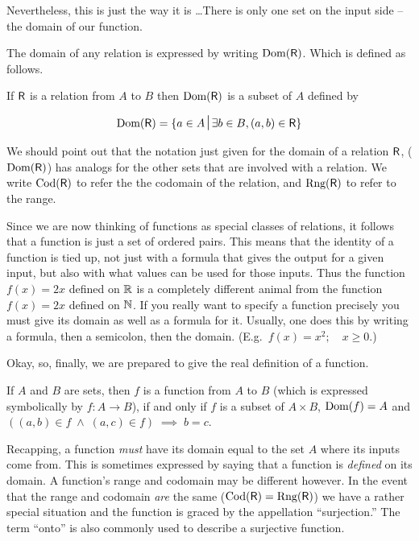 Nevertheless, this is just the way it is \ldots  There is only one
set on the input side -- the domain of our function. 

The domain of
any relation is expressed by writing $\mbox{Dom}(\mbox{\textsf R})$.  Which is 
defined as follows.

\begin{defi}
If $\mbox{\textsf R}$ is a relation from $A$ to $B$ then $\mbox{Dom}(\mbox{\textsf R})$ is
a subset of $A$ defined by

\[ \Dom{\relR} = \{a \in A \suchthat \exists b \in B, (a,b) \in \relR \} 
\]

\end{defi}

We should point out that the notation just given for the domain of a 
relation $\mbox{\textsf R}$, ($\mbox{Dom}(\mbox{\textsf R})$) has analogs for the other 
sets that are involved with a relation.  We write $\mbox{Cod}(\mbox{\textsf R})$
to refer the the codomain of the relation, and $\mbox{Rng}(\mbox{\textsf R})$
to refer to the range. 

Since we are now thinking of functions as special classes of relations, it follows that a function is just 
a set of ordered pairs.  This means that the identity of a function is
tied up, not just with a formula that gives the output for a given input,
but also with what values can be used for those inputs.   Thus the function
$f(x)=2x$ defined on ${\mathbb R}$ is a completely different animal from 
the function $f(x)=2x$ defined on ${\mathbb N}$.  If you really want to
specify a function precisely you must give its domain as well as a 
formula for it.  Usually, one does this by writing a formula, then a 
semicolon, then the domain.  (E.g.\ $f(x)=x^2; \quad x \geq 0$.)

Okay, so, finally, we are prepared to give the real
definition of a function.

\begin{defi}
If $A$ and $B$ are sets, then $f$ is a function from $A$ to $B$ (which
is expressed symbolically by $f:A\longrightarrow B$), if and only if
$f$ is a subset of $A\times B$, $\mbox{Dom}(f)=A$ and $((a,b) \in f \; \land \; (a,c) \in f) \; \implies \; b=c$.
\end{defi}

Recapping, a function \emph{must} have its domain equal to the set $A$
where its inputs come from.  This is sometimes expressed by saying that
a function is \emph{defined} on its domain.  A function's range and codomain
may be different however.  In the event that the range and codomain \emph{are}
the same ($\mbox{Cod}(\mbox{\textsf R}) = \mbox{Rng}(\mbox{\textsf R})$)
we have a rather special situation and the function is graced by
the appellation ``surjection.''  The term ``onto'' is also commonly used
to describe a surjective function.  


